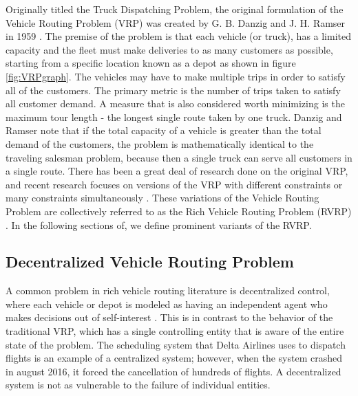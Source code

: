 \documentclass{sig-alternate}
\begin{document}
Originally titled the Truck Dispatching Problem, the original formulation of the Vehicle Routing Problem (VRP) was created by G. B. Danzig and J. H. Ramser in 1959 \cite{Danzig:1959}. The premise of the problem is that each vehicle (or truck), has a limited capacity and the fleet must make deliveries to as many customers as possible, starting from a specific location known as a depot as shown in figure \ref{fig:VRPgraph}. The vehicles may have to make multiple trips in order to satisfy all of the customers. The primary metric is the number of trips taken to satisfy all customer demand. A measure that is also considered worth minimizing is the maximum tour length - the longest single route taken by one truck. Danzig and Ramser note that if the total capacity of a vehicle is greater than the total demand of the customers, the problem is mathematically identical to the traveling salesman problem, because then a single truck can serve all customers in a single route. There has been a great deal of research done on the original VRP, and recent research focuses on versions of the VRP with different constraints or many constraints simultaneously \cite{Caceres-Cruz:2014}. These variations of the Vehicle Routing Problem are collectively referred to as the Rich Vehicle Routing Problem (RVRP) . In the following sections of, we define prominent variants of the RVRP.
\subsection{Decentralized Vehicle Routing Problem}
A common problem in rich vehicle routing literature is decentralized control, where each vehicle or depot is modeled as having an independent agent who makes decisions out of self-interest \cite{Caceres-Cruz:2014}. This is in contrast to the behavior of the traditional VRP, which has a single controlling entity that is aware of the entire state of the problem. The scheduling system that Delta Airlines uses to dispatch flights is an example of a centralized system; however, when the system crashed in august 2016, it forced the cancellation of hundreds of flights. A decentralized system is not as vulnerable to the failure of individual entities.
\end{document}
